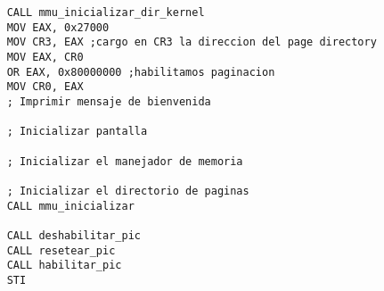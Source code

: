 \begin{codesnippet}
\begin{verbatim}
	CALL mmu_inicializar_dir_kernel
	MOV EAX, 0x27000
	MOV CR3, EAX ;cargo en CR3 la direccion del page directory
	MOV EAX, CR0
    OR EAX, 0x80000000 ;habilitamos paginacion
	MOV CR0, EAX
    ; Imprimir mensaje de bienvenida

    ; Inicializar pantalla
    
    ; Inicializar el manejador de memoria
    
    ; Inicializar el directorio de paginas
    CALL mmu_inicializar
    
    CALL deshabilitar_pic
    CALL resetear_pic
    CALL habilitar_pic
    STI
\end{verbatim}
\end{codesnippet}
